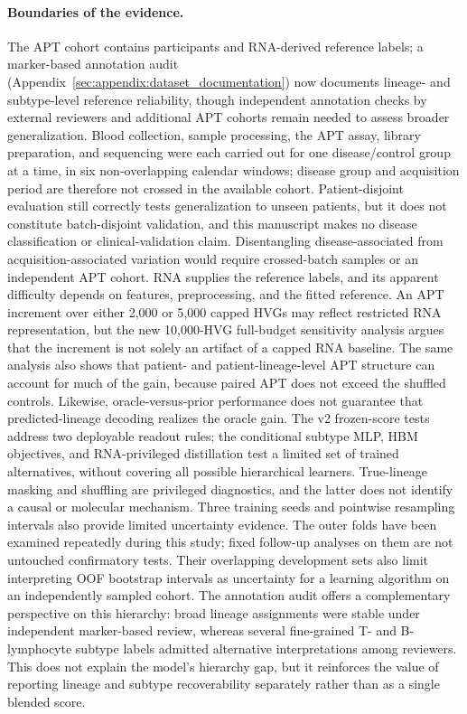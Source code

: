 \paragraph{Boundaries of the evidence.}
The APT cohort contains \numparticipants{} participants and RNA-derived reference labels;
a marker-based annotation audit (Appendix~\ref{sec:appendix:dataset_documentation}) now
documents lineage- and subtype-level reference reliability, though independent
annotation checks by external reviewers and additional APT cohorts remain needed
to assess broader generalization. Blood collection, sample processing, the APT
assay, library preparation, and sequencing were each carried out for one
disease/control group at a time, in six non-overlapping calendar windows; disease
group and acquisition period are therefore not crossed in the available cohort.
Patient-disjoint evaluation still correctly tests generalization to unseen
patients, but it does not constitute batch-disjoint validation, and this
manuscript makes no disease classification or clinical-validation claim.
Disentangling disease-associated from acquisition-associated variation would
require crossed-batch samples or an independent APT cohort. RNA supplies the reference labels, and its apparent
difficulty depends on features, preprocessing, and the fitted reference.
An APT increment over either 2{,}000 or 5{,}000 capped HVGs may reflect restricted RNA representation,
but the new 10{,}000-HVG full-budget sensitivity analysis argues that the
increment is not solely an artifact of a capped RNA baseline. The same analysis
also shows that patient- and patient-lineage-level APT structure can account
for much of the gain, because paired APT does not exceed the shuffled controls.
Likewise, oracle-versus-prior performance does not guarantee that
predicted-lineage decoding realizes the oracle gain. The v2 frozen-score tests
address two deployable readout rules; the conditional subtype MLP, HBM
objectives, and RNA-privileged distillation test a limited set of trained
alternatives, without covering all possible hierarchical learners.
True-lineage masking and shuffling are privileged diagnostics, and the latter
does not identify a causal or molecular mechanism. Three training seeds and
pointwise resampling intervals also provide limited uncertainty evidence.
The outer folds have been examined repeatedly during this study; fixed
follow-up analyses on them are not untouched confirmatory tests. Their
overlapping development sets also limit interpreting OOF bootstrap intervals
as uncertainty for a learning algorithm on an independently sampled cohort.
The annotation audit offers a complementary perspective on this hierarchy: broad
lineage assignments were stable under independent marker-based review, whereas
several fine-grained T- and B-lymphocyte subtype labels admitted alternative
interpretations among reviewers. This does not explain the model's hierarchy
gap, but it reinforces the value of reporting lineage and subtype recoverability
separately rather than as a single blended score.

